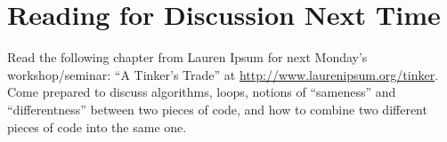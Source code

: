 \documentclass{article}
\begin{document}
\section{Reading for Discussion Next Time}

Read the following chapter from Lauren Ipsum for next Monday's workshop/seminar:
``A Tinker's Trade'' at \url{http://www.laurenipsum.org/tinker}.
Come prepared to discuss algorithms, loops, notions of
``sameness'' and ``differentness'' between two pieces of code,
and how to combine two different pieces of code into the same one.
\end{document}
